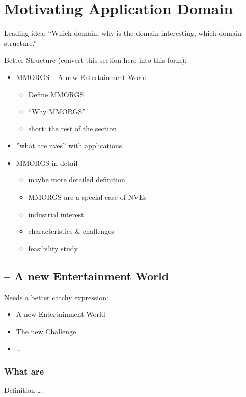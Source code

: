 \section{Motivating Application Domain}
Leading idea: ``Which domain, why is the domain interesting, which
domain structure.''

Better Structure (convert this section here into this form):
\begin{itemize}
	\item MMORGS -- A new Entertainment World
	\begin{itemize}
		\item Define MMORGS
		\item ``Why MMORGS''
		\item short: the rest of the section
	\end{itemize}
	\item ''what are nves'' with applications
	\item MMORGS in detail
	\begin{itemize}
		\item maybe more detailed definition
		\item MMORGS are a special case of NVEs
		\item industrial interest
  		\item characteristics \& challenges
		\item feasibility study
	\end{itemize}
\end{itemize}

\subsection{\MMORGS -- A new Entertainment World}
Needs a better catchy expression:
\begin{itemize}
	\item A new Entertainment World
	\item The new Challenge
	\item \dots
\end{itemize}

\subsubsection{What are \MMORGS}
Definition \ldots


